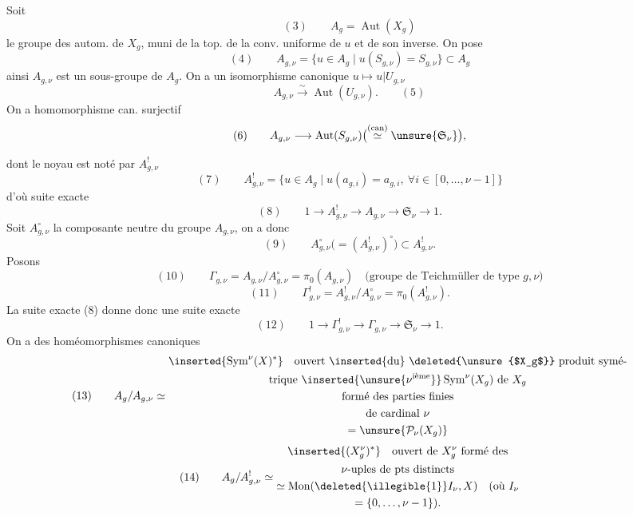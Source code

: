 Soit
\[
(3)\qquad A_g=\operatorname{Aut}(X_g)
\]
le groupe des autom. de $X_g$, muni de la
top. de la conv. uniforme de $u$ et de son
inverse. On pose
\[
(4)\qquad A_{g,\nu}=\{u\in A_g\mid u(S_{g,\nu})=S_{g,\nu}\}\subset A_g
\]
ainsi $A_{g,\nu}$ est un sous-groupe de $A_g$. On
a un isomorphisme canonique $u\mapsto u|U_{g,\nu}$
\[
A_{g,\nu}\xrightarrow{\sim}\operatorname{Aut}(U_{g,\nu}).\qquad(5)
\]
On a  homomorphisme can. surjectif
\[
(6)\qquad A_{g,\nu}\longrightarrow\operatorname{Aut}(S_{g,\nu})
\bigl(\overset{\text{(can)}}{\simeq}\unsure{\mathfrak S_\nu}\bigr),
\]

dont le noyau est noté par $A_{g,\nu}^!$
\[
(7)\qquad A_{g,\nu}^!=\{u\in A_g\mid u(a_{g,i})=a_{g,i},\ \forall i\in[0,\ldots,\nu-1]\}
\]
d'où suite exacte
\[
(8)\qquad 1\longrightarrow A_{g,\nu}^!\longrightarrow A_{g,\nu}
\longrightarrow\mathfrak S_\nu\longrightarrow1.
\]
Soit $A_{g,\nu}^{\circ}$ la composante neutre du groupe
$A_{g,\nu}$, on a donc
\[
(9)\qquad A_{g,\nu}^{\circ}\bigl(=(A_{g,\nu}^!)^{\circ}\bigr)\subset A_{g,\nu}^!.
\]
Posons
\[
(10)\qquad \Gamma_{g,\nu}=A_{g,\nu}/A_{g,\nu}^{\circ}=\pi_0(A_{g,\nu})
\quad\text{(groupe de Teichmüller de type }g,\nu\text{)}
\]
\[
(11)\qquad \Gamma_{g,\nu}^!=A_{g,\nu}^!/A_{g,\nu}^{\circ}=\pi_0(A_{g,\nu}^!).
\]
La suite exacte (8) donne donc une suite
exacte
\[
(12)\qquad 1\longrightarrow\Gamma_{g,\nu}^!\longrightarrow\Gamma_{g,\nu}
\longrightarrow\mathfrak S_\nu\longrightarrow1.
\]
On a des homéomorphismes canoniques
\[
(13)\qquad A_g/A_{g,\nu}\simeq
\begin{gathered}
\inserted{\operatorname{Sym}^{\nu}(X)^*}\quad
\text{ouvert \inserted{du} \deleted{\unsure{$X_g$}} produit symé-}\\
\text{trique }\inserted{\unsure{\nu^{\text{ième}}}}\operatorname{Sym}^{\nu}(X_g)\text{ de }X_g\\
\text{formé des parties finies}\\
\text{de cardinal }\nu\\
=\unsure{\mathcal P_\nu(X_g)}
\end{gathered}
\]
\[
(14)\qquad A_g/A_{g,\nu}^!\simeq
\begin{gathered}
\inserted{(X_g^{\nu})^*}\quad\text{ouvert de }X_g^{\nu}\text{ formé des}\\
\nu\text{-uples de pts distincts}\\
\simeq\operatorname{Mon}(\deleted{\illegible{1}}I_\nu,X)\quad\text{(où }I_\nu\\
=\{0,\ldots,\nu-1\}\text{).}
\end{gathered}
\]

